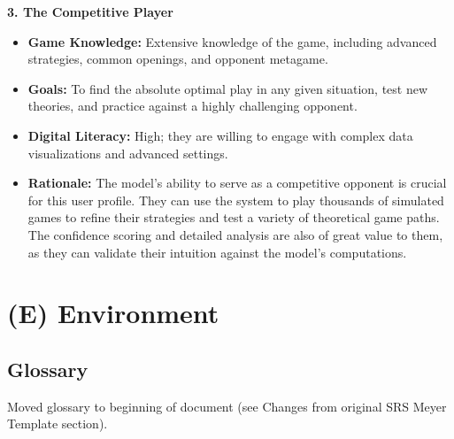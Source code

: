 \documentclass{article}
\begin{document}
\noindent\textbf{3. The Competitive Player}
\begin{itemize}
    \item \textbf{Game Knowledge:} Extensive knowledge of the game, including advanced strategies, common openings, and opponent metagame.
    \item \textbf{Goals:} To find the absolute optimal play in any given situation, test new theories, and practice against a highly challenging opponent.
    \item \textbf{Digital Literacy:} High; they are willing to engage with complex data visualizations and advanced settings.
    \item \textbf{Rationale:} The \AI{} model's ability to serve as a competitive opponent is crucial for this user profile. They can use the system to play thousands of simulated games to refine their strategies and test a variety of theoretical game paths. The confidence scoring and detailed analysis are also of great value to them, as they can validate their intuition against the model's computations.
\end{itemize}


\newpage{}



\section*{(E) Environment}\label{sec:srs-environment}
\renewcommand{\thesubsection}{E.\arabic{subsection}}
\setcounter{subsection}{0}

\subsection{Glossary}\label{subsec:glossary}
\raggedright Moved glossary to beginning of document (see Changes from original SRS Meyer Template section).
\end{document}
